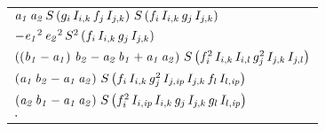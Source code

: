 \documentclass[12pt]{article}
\begin{document}
 \begin{longtable}{l}
${\it a_1}\,{\it a_2}\,S\left(g_{i}\,I_{i,k}\,f_{j}\,I_{j,k}\right)
 \,S\left(f_{i}\,I_{i,k}\,g_{j}\,I_{j,k}\right)$
\\
$-{\it e_1}^2\,{\it e_2}^2\,S^2\left(f_{i}\,I_{i,k}\,g_{j}\,I_{j,k}
 \right)$
\\
$\left(\left({\it b_1}-{\it a_1}\right)\,{\it b_2}-{\it a_2}\,
 {\it b_1}+{\it a_1}\,{\it a_2}\right)\,S\left(f_{i}^2\,I_{i,k}\,I_{i
 ,l}\,g_{j}^2\,I_{j,k}\,I_{j,l}\right)$
\\
$\left({\it a_1}\,{\it b_2}-{\it a_1}\,{\it a_2}\right)\,S\left(f_{i
 }\,I_{i,k}\,g_{j}^2\,I_{j,{\it ip}}\,I_{j,k}\,f_{l}\,I_{l,{\it ip}}
 \right)$
\\
$\left({\it a_2}\,{\it b_1}-{\it a_1}\,{\it a_2}\right)\,S\left(f_{i
 }^2\,I_{i,{\it ip}}\,I_{i,k}\,g_{j}\,I_{j,k}\,g_{l}\,I_{l,{\it ip}}
 \right)$
\\
$\cdot$
\end{longtable}
\end{document}
